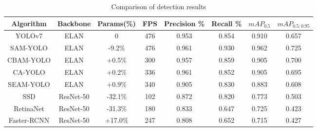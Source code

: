 \documentclass[aic]{iosart2x}
\begin{document}
\begin{table}[!htbp]
    \centering
    \caption{Comparison of detection results}
    \label{tab:comparative_experiment}
    
    \begin{tabular}{cccccccc}
        
        \toprule
        
 Algorithm   & Backbone  & Params(\%) & FPS & Precision \% & Recall \% & $ mAP_{0.5}$ & $ mAP_{0.5:0.95}$ \\ \midrule
 YOLOv7      & ELAN      & 0          & 476 & 0.953        & 0.854     & 0.910         & 0.657             \\
 SAM-YOLO    & ELAN      & -9.2\%     & 476 & 0.961        & 0.930     & 0.962         & 0.725             \\
 CBAM-YOLO   & ELAN      & +0.5\%     & 300 & 0.957        & 0.859     & 0.905         & 0.700             \\
 CA-YOLO     & ELAN      & +0.2\%     & 336 & 0.961        & 0.852     & 0.905         & 0.695             \\
 SEAM-YOLO   & ELAN      & +0.9\%     & 340 & 0.905        & 0.830     & 0.883         & 0.608             \\
 SSD         & ResNet-50 & -32.1\%    & 102 & 0.872        & 0.820     & 0.773         & 0.503             \\    
 RetinaNet   & ResNet-50 & -31.3\%    & 180 & 0.833        & 0.647     & 0.725         & 0.423             \\
 Faster-RCNN & ResNet-50 & +17.0\%    & 247 & 0.808        & 0.652     & 0.715         & 0.427             \\    
        \bottomrule
    \end{tabular}
\end{table}
\end{document}
